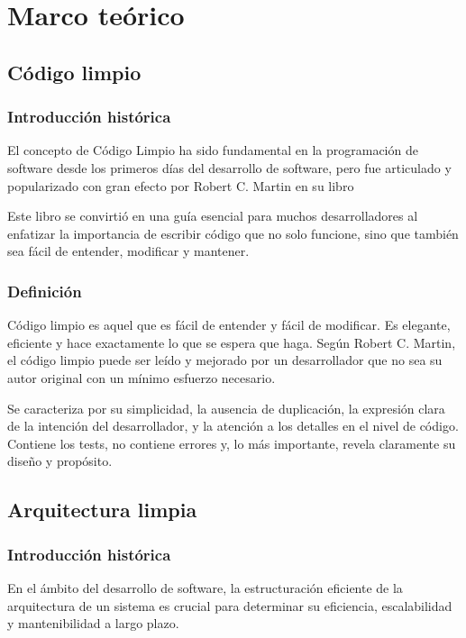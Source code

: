 \chapter{Marco teórico}\label{ch:chapter_2}



\section{Código limpio}

\subsection{Introducción histórica}
El concepto de Código Limpio ha sido fundamental en la programación de software desde los primeros días del desarrollo
de software, pero fue articulado y popularizado con gran efecto por Robert C. Martin en su libro~\cite{book_martin_2008}

Este libro se convirtió en una guía esencial para muchos desarrolladores al enfatizar la importancia de escribir código
que no solo funcione, sino que también sea fácil de entender, modificar y mantener.

\subsection{Definición}
Código limpio es aquel que es fácil de entender y fácil de modificar.
Es elegante, eficiente y hace exactamente lo que se espera que haga.
Según Robert C. Martin, el código limpio puede ser leído y mejorado por un
desarrollador que no sea su autor original con un mínimo esfuerzo necesario.

Se caracteriza por su simplicidad, la ausencia de duplicación, la expresión clara de la intención del desarrollador, y
la atención a los detalles en el nivel de código.
Contiene los tests, no contiene errores y, lo más importante, revela claramente su diseño y propósito.


\section{Arquitectura limpia}

\subsection{Introducción histórica}
En el ámbito del desarrollo de software, la estructuración eficiente de la arquitectura de un sistema
es crucial para determinar su eficiencia, escalabilidad y mantenibilidad a largo plazo.

